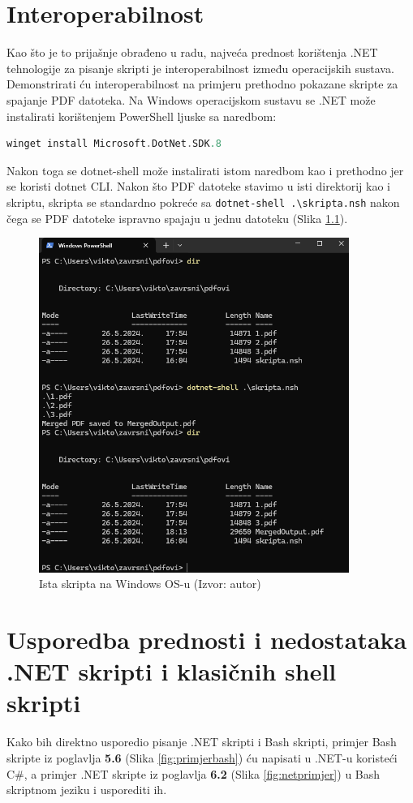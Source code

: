 \documentclass{foi}
\begin{document}
\chapter{Interoperabilnost}
Kao što je to prijašnje obrađeno u radu, najveća prednost korištenja .NET tehnologije za pisanje skripti je interoperabilnost između operacijskih sustava. Demonstrirati ću interoperabilnost na primjeru prethodno pokazane skripte za spajanje PDF datoteka. Na Windows operacijskom sustavu se .NET može instalirati korištenjem PowerShell ljuske sa naredbom\cite{windowsdotnet}:
\begin{lstlisting}[language=C++]
winget install Microsoft.DotNet.SDK.8
\end{lstlisting}
Nakon toga se dotnet-shell može instalirati istom naredbom kao i prethodno jer se koristi dotnet CLI.
Nakon što PDF datoteke stavimo u isti direktorij kao i skriptu, skripta se standardno pokreće sa \verb|dotnet-shell .\skripta.nsh| nakon čega se PDF datoteke ispravno spajaju u jednu datoteku (Slika \ref{fig:pdfws}).

\begin{figure}[H]
    \centering
    \includegraphics[width=0.9\textwidth]{slike/pdfwindows.png}
    \caption{Ista skripta na Windows OS-u (Izvor: autor)}
    \label{fig:pdfws}
\end{figure}

\chapter{Usporedba prednosti i nedostataka .NET skripti i klasičnih shell skripti}
Kako bih direktno usporedio pisanje .NET skripti i Bash skripti, primjer Bash skripte iz poglavlja \textbf{5.6} (Slika \ref{fig:primjerbash}) ću napisati u .NET-u koristeći C\#, a primjer .NET skripte iz poglavlja \textbf{6.2} (Slika \ref{fig:netprimjer}) u Bash skriptnom jeziku i usporediti ih.
\end{document}
